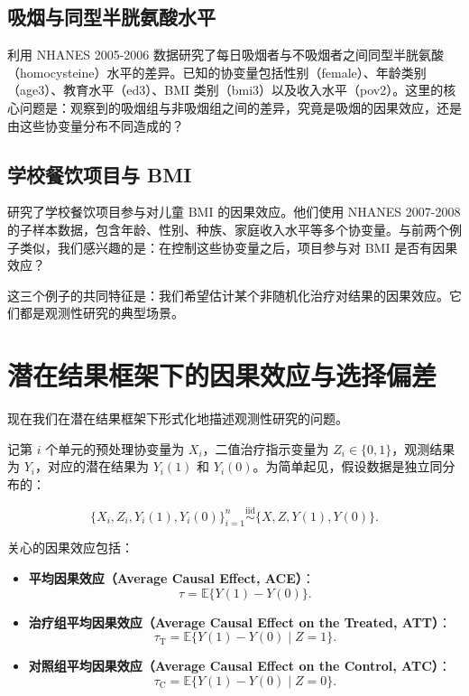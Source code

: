 \subsection{吸烟与同型半胱氨酸水平}\label{sec:10-smoking}

\citet{Bazzano:2003} 利用 NHANES 2005-2006 数据研究了每日吸烟者与不吸烟者之间同型半胱氨酸（homocysteine）水平的差异。已知的协变量包括性别（female）、年龄类别（age3）、教育水平（ed3）、BMI 类别（bmi3）以及收入水平（pov2）。这里的核心问题是：观察到的吸烟组与非吸烟组之间的差异，究竟是吸烟的因果效应，还是由这些协变量分布不同造成的？

\subsection{学校餐饮项目与 BMI}\label{sec:10-school-meal}

\citet{Chan:2016} 研究了学校餐饮项目参与对儿童 BMI 的因果效应。他们使用 NHANES 2007-2008 的子样本数据，包含年龄、性别、种族、家庭收入水平等多个协变量。与前两个例子类似，我们感兴趣的是：在控制这些协变量之后，项目参与对 BMI 是否有因果效应？

这三个例子的共同特征是：我们希望估计某个非随机化治疗对结果的因果效应。它们都是观测性研究的典型场景。

\section{潜在结果框架下的因果效应与选择偏差}\label{sec:10-selection-bias}

现在我们在潜在结果框架下形式化地描述观测性研究的问题。

记第 $i$ 个单元的预处理协变量为 $X_i$，二值治疗指示变量为 $Z_i \in \{0,1\}$，观测结果为 $Y_i$，对应的潜在结果为 $Y_i(1)$ 和 $Y_i(0)$。为简单起见，假设数据是独立同分布的：

\[
\{X_i, Z_i, Y_i(1), Y_i(0)\}_{i=1}^n \stackrel{\text{iid}}{\sim} \{X, Z, Y(1), Y(0)\}.
\]

关心的因果效应包括：
\begin{itemize}
  \item \textbf{平均因果效应（Average Causal Effect, ACE）}：
  \[
  \tau = \mathbb{E}\{Y(1) - Y(0)\}.
  \]
  \item \textbf{治疗组平均因果效应（Average Causal Effect on the Treated, ATT）}：
  \[
  \tau_{\mathrm{T}} = \mathbb{E}\{Y(1) - Y(0) \mid Z = 1\}.
  \]
  \item \textbf{对照组平均因果效应（Average Causal Effect on the Control, ATC）}：
  \[
  \tau_{\mathrm{C}} = \mathbb{E}\{Y(1) - Y(0) \mid Z = 0\}.
  \]
\end{itemize}

